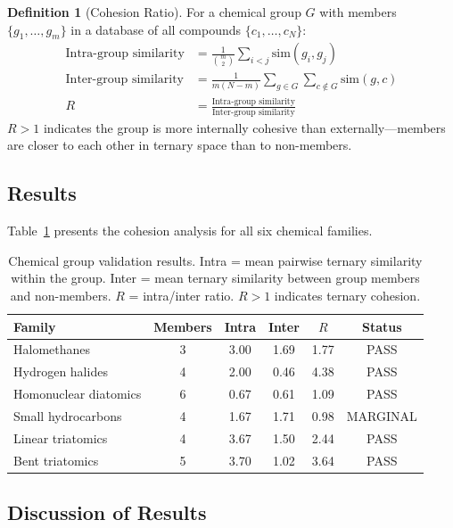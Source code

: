 \documentclass[11pt,a4paper]{article}
\theoremstyle{definition}
\newtheorem{definition}[theorem]{Definition}
\theoremstyle{remark}
\begin{document}
\begin{definition}[Cohesion Ratio]
\label{def:cohesion}
For a chemical group $G$ with members $\{g_1, \ldots, g_m\}$ in a database of all compounds $\{c_1, \ldots, c_N\}$:
\begin{align}
\text{Intra-group similarity} &= \frac{1}{\binom{m}{2}} \sum_{i < j} \mathrm{sim}(g_i, g_j) \label{eq:intra} \\
\text{Inter-group similarity} &= \frac{1}{m(N-m)} \sum_{g \in G} \sum_{c \notin G} \mathrm{sim}(g, c) \label{eq:inter} \\
R &= \frac{\text{Intra-group similarity}}{\text{Inter-group similarity}} \label{eq:cohesion_ratio}
\end{align}
$R > 1$ indicates the group is more internally cohesive than externally---members are closer to each other in ternary space than to non-members.
\end{definition}

\subsection{Results}

Table~\ref{tab:validation} presents the cohesion analysis for all six chemical families.

\begin{table}[H]
\centering
\caption{Chemical group validation results. Intra = mean pairwise ternary similarity within the group. Inter = mean ternary similarity between group members and non-members. $R$ = intra/inter ratio. $R > 1$ indicates ternary cohesion.}
\label{tab:validation}
\begin{tabular}{lccccc}
\toprule
Family & Members & Intra & Inter & $R$ & Status \\
\midrule
Halomethanes         & 3 & 3.00 & 1.69 & 1.77 & PASS \\
Hydrogen halides     & 4 & 2.00 & 0.46 & 4.38 & PASS \\
Homonuclear diatomics & 6 & 0.67 & 0.61 & 1.09 & PASS \\
Small hydrocarbons   & 4 & 1.67 & 1.71 & 0.98 & MARGINAL \\
Linear triatomics    & 4 & 3.67 & 1.50 & 2.44 & PASS \\
Bent triatomics      & 5 & 3.70 & 1.02 & 3.64 & PASS \\
\bottomrule
\end{tabular}
\end{table}

\subsection{Discussion of Results}
\end{document}
